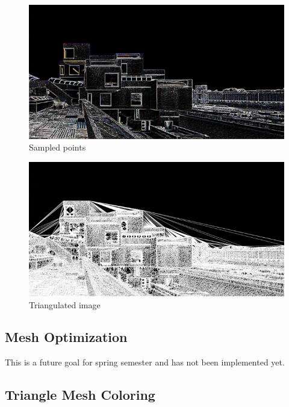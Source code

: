 \begin{figure}[H]
    \centering
    \includegraphics[width=\linewidth]{Figures/vectorization_images/sampled.png}
    \caption{Sampled points}
    \label{fig:arch_sampled}
\end{figure}

\begin{figure}[H]
    \centering
    \includegraphics[width=\linewidth]{Figures/vectorization_images/triangulated.png}
    \caption{Triangulated image}
    \label{fig:arch_triangulated}
\end{figure}

\subsection{Mesh Optimization}

This is a future goal for spring semester and has not been implemented yet.

\subsection{Triangle Mesh Coloring}

